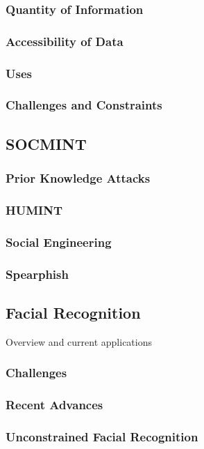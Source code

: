 \documentclass{article}
\begin{document}
\subsubsection{Quantity of Information}

\subsubsection{Accessibility of Data}

\subsubsection{Uses}

\subsubsection{Challenges and Constraints}

\subsection{SOCMINT}
\subsubsection{Prior Knowledge Attacks}

\subsubsection{HUMINT}

\subsubsection{Social Engineering}

\subsubsection{Spearphish}

\subsection{Facial Recognition}
Overview and current applications

\subsubsection{Challenges}

\subsubsection{Recent Advances}

\subsubsection{Unconstrained Facial Recognition}


\end{document}
